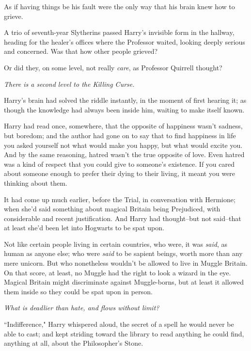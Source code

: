 As if having things be his fault were the only way that his brain knew how to grieve.

A trio of seventh-year Slytherins passed Harry's invisible form in the hallway, heading for the healer's offices where the Professor waited, looking deeply serious and concerned. Was that how other people grieved?

Or did they, on some level, not really \emph{care}, as Professor Quirrell thought?

\emph{There is a second level to the Killing Curse.}

Harry's brain had solved the riddle instantly, in the moment of first hearing it; as though the knowledge had always been inside him, waiting to make itself known.

Harry had read once, somewhere, that the opposite of happiness wasn't sadness, but boredom; and the author had gone on to say that to find happiness in life you asked yourself not what would make you happy, but what would excite you. And by the same reasoning, hatred wasn't the true opposite of love. Even hatred was a kind of respect that you could give to someone's existence. If you cared about someone enough to prefer their dying to their living, it meant you were thinking about them.

It had come up much earlier, before the Trial, in conversation with Hermione; when she'd said something about magical Britain being Prejudiced, with considerable and recent justification. And Harry had thought\---but not said\---that at least she'd been let into Hogwarts to be spat upon.

Not like certain people living in certain countries, who were, it was \emph{said}, as human as anyone else; who were \emph{said} to be sapient beings, worth more than any mere unicorn. But who nonetheless wouldn't be allowed to live in Muggle Britain. On that score, at least, no Muggle had the right to look a wizard in the eye. Magical Britain might discriminate against Muggle-borns, but at least it allowed them inside so they could be spat upon in person.

\emph{What is deadlier than hate, and flows without limit?}

``Indifference," Harry whispered aloud, the secret of a spell he would never be able to cast; and kept striding toward the library to read anything he could find, anything at all, about the Philosopher's Stone.

